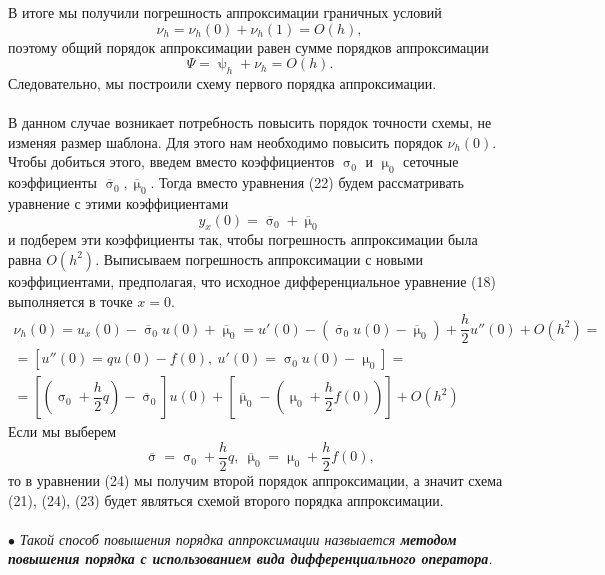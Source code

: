 \documentclass[a4paper, 12pt]{report}
\numberwithin{equation}{section}
\newcommand{\ol}{\overline}
\renewcommand{\sigma}{\upsigma}
\renewcommand{\psi}{\uppsi}
\renewcommand{\mu}{\upmu}
\begin{document}
			В итоге мы получили погрешность аппроксимации граничных условий
			$$\nu_h = \nu_h(0) + \nu_h(1) = O(h),$$ поэтому общий порядок аппроксимации равен сумме порядков аппроксимации
			$$\Psi = \psi_h + \nu_h = O(h).$$
			Следовательно, мы построили схему первого порядка аппроксимации.\\\\
			В данном случае возникает потребность повысить порядок точности схемы, не изменяя размер шаблона. Для этого нам необходимо повысить порядок $\nu_h(0)$. Чтобы добиться этого, введем вместо коэффициентов $\sigma_0$ и $\mu_0$ сеточные коэффициенты $\ol \sigma_0, \ol \mu _0$. Тогда вместо уравнения (22) будем рассматривать уравнение с этими коэффициентами
			\begin{equation}
				y_x(0) = \ol \sigma_0 + \ol \mu _0
			\end{equation}
			 и подберем эти коэффициенты так, чтобы погрешность аппроксимации была равна $O(h^2)$. Выписываем погрешность аппроксимации с новыми коэффициентами, предполагая, что исходное дифференциальное уравнение (18) выполняется в точке $x =0$.
			 \begin{multline*}
			 	\nu_h(0) = u_x(0) - \ol\sigma_0 u(0) + \ol\mu_0 = u'(0) - (\ol\sigma_0 u(0) - \ol \mu_0)+ \dfrac h2 u''(0) + O(h^2) =\\= [u''(0) =qu(0) - f(0),\ u'(0)=\sigma_0 u(0) - \mu_0] =\\= \left[\left(\sigma_0 + \dfrac h2 q\right) - \ol\sigma_0\right]u(0) + \left[\ol \mu_0 - \left(\mu_0 + \dfrac h2 f(0)\right)\right] + O(h^2)
			 \end{multline*}
			 Если мы выберем
			 $$\ol \sigma = \sigma_0 + \dfrac h2 q,\ \ol\mu_0 = \mu_0 + \dfrac h2 f(0),$$ то в уравнении (24) мы получим второй порядок аппроксимации, а значит схема (21), (24), (23) будет являться схемой второго порядка аппроксимации.\\\\
			$\bullet$ \textit{Такой способ повышения порядка аппроксимации назвыается \textbf{методом повышения порядка с использованием вида дифференциального оператора}.}
	
\end{document}
